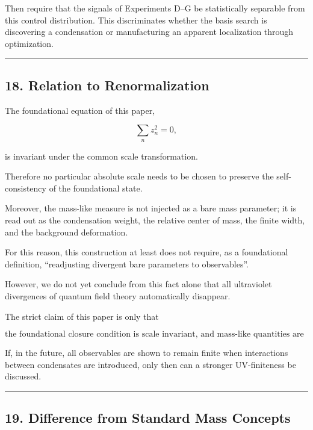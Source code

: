 \documentclass[
  a4paper,
]{article}
\begin{document}
Then require that the signals of Experiments D--G be statistically
separable from this control distribution. This discriminates whether the
basis search is discovering a condensation or manufacturing an apparent
localization through optimization.

\begin{center}\rule{0.5\linewidth}{0.5pt}\end{center}

\subsection{18. Relation to
Renormalization}\label{relation-to-renormalization}

The foundational equation of this paper,

\[
\sum_n z_n^2=0,
\]

is invariant under the common scale transformation.

Therefore no particular absolute scale needs to be chosen to preserve
the self-consistency of the foundational state.

Moreover, the mass-like measure is not injected as a bare mass
parameter; it is read out as the condensation weight, the relative
center of mass, the finite width, and the background deformation.

For this reason, this construction at least does not require, as a
foundational definition, ``readjusting divergent bare parameters to
observables''.

However, we do not yet conclude from this fact alone that all
ultraviolet divergences of quantum field theory automatically disappear.

The strict claim of this paper is only that

\[
\boxed{
\text{the foundational closure condition is scale invariant, and mass-like quantities are not introduced as external bare parameters}
}
\]

If, in the future, all observables are shown to remain finite when
interactions between condensates are introduced, only then can a
stronger UV-finiteness be discussed.

\begin{center}\rule{0.5\linewidth}{0.5pt}\end{center}

\subsection{19. Difference from Standard Mass
Concepts}\label{difference-from-standard-mass-concepts}
\end{document}

